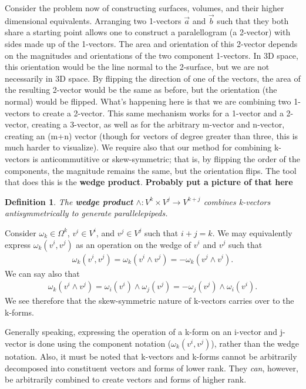 \documentclass{book}
\newtheorem{defn}[equation]{Definition}
\begin{document}
Consider the problem now of constructing surfaces, volumes, and their higher dimensional equivalents. Arranging two 1-vectors $\vec{a}$ and $\vec{b}$ such that they both share a starting point allows one to construct a paralellogram (a 2-vector) with sides made up of the 1-vectors. The area and orientation of this 2-vector depends on the magnitudes and orientations of the two component 1-vectors. In 3D space, this orientation would be the line normal to the 2-surface, but we are not necessarily in 3D space. By flipping the direction of one of the vectors, the area of the resulting 2-vector would be the same as before, but the orientation (the normal) would be flipped. What's happening here is that we are combining two 1-vectors to create a 2-vector. This same mechanism works for a 1-vector and a 2-vector, creating a 3-vector, as well as for the arbitrary m-vector and n-vector, creating an (m+n) vector (though for vectors of degree greater than three, this is much harder to visualize). We require also that our method for combining k-vectors is anticommutitive or skew-symmetric; that is, by flipping the order of the components, the magnitude remains the same, but the orientation flips. The tool that does this is the \textbf{wedge product}.
\textbf{Probably put a picture of that here}



\begin{defn}
	
	The \textbf{wedge product} $\wedge : V^k\times V^j \to V^{k+j}$ combines k-vectors antisymmetrically to generate parallelepipeds. 
\end{defn}






Consider $\omega_k \in \Omega^k$, $v^i \in V^i$, and $v^j \in V^j$ such that $i + j = k$. We may equivalently express $\omega_k(v^i, v^j)$ as an operation on the wedge of $v^i$ and $v^j$ such that \begin{gather}\omega_k(v^i, v^j) = \omega_k(v^i \wedge v^j) = -\omega_k(v^j \wedge v^i).\end{gather} We can say also that \begin{gather}\omega_k(v^i \wedge v^j) = \omega_i(v^i)\wedge \omega_j(v^j) = -\omega_j(v^j) \wedge \omega_i(v^i).\end{gather} We see therefore that the skew-symmetric nature of k-vectors carries over to the k-forms. 

Generally speaking, expressing the operation of a k-form on an i-vector and j-vector is done using the component notation ($\omega_k(v^i, v^j)$), rather than the wedge notation. Also, it must be noted that k-vectors and k-forms cannot be arbitrarily decomposed into constituent vectors and forms of lower rank. They \emph{can}, however, be arbitrarily combined to create vectors and forms of higher rank. 
\end{document}
